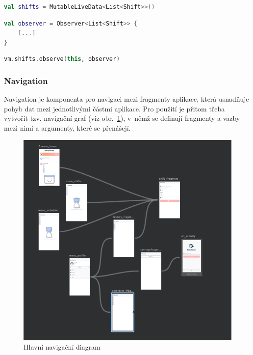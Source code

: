 \documentclass[twoside]{ctuthesis}
\begin{document}
\begin{lstlisting}[language=Kotlin, caption={Definice LiveData ve ViewModelu}, label={lst:livedatadef}]
val shifts = MutableLiveData<List<Shift>>()
\end{lstlisting}

\begin{lstlisting}[language=Kotlin, caption={Definice observera v~UI komponentě}, label={lst:observer}]
val observer = Observer<List<Shift>> {
	[...]
}
\end{lstlisting}

\begin{lstlisting}[language=Kotlin, caption={Spojení Observera a LiveDat v~UI komponentě}, label={lst:observe}]
vm.shifts.observe(this, observer)
\end{lstlisting}

\subsubsection{Navigation}
Navigation je komponenta pro navigaci mezi fragmenty aplikace, která usnadňuje pohyb dat mezi jednotlivými částmi aplikace. Pro použití je přitom třeba vytvořit tzv. navigační graf (viz obr.~\ref{fig:main-navigation}), v~němž se definují fragmenty a vazby mezi nimi a argumenty, které se přenášejí.

\begin{figure}[h!]
	\includegraphics[scale=.65]{img/navigation.png}
	\caption{Hlavní navigační diagram}
	\label{fig:main-navigation}
\end{figure}
\end{document}
